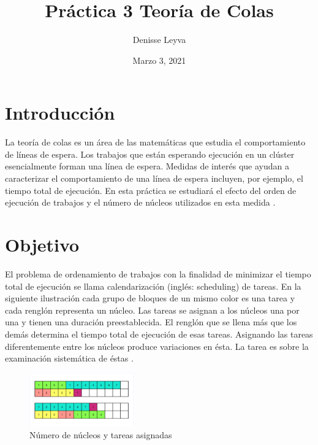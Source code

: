 \documentclass{article}
\title{Práctica 3 Teoría de Colas}
\author{Denisse Leyva}
\date{Marzo 3, 2021}
\begin{document}
\maketitle




\section{Introducción}
La teoría de colas es un área de las matemáticas que estudia el comportamiento de líneas de espera. Los trabajos que están esperando ejecución en un clúster esencialmente forman una línea de espera. Medidas de interés que ayudan a caracterizar el comportamiento de una línea de espera incluyen, por ejemplo, el tiempo total de ejecución. En esta práctica se estudiará el efecto del orden de ejecución de trabajos y el número de núcleos utilizados en esta medida \cite{Satu_Elisa_Schaeffer}.

\section{Objetivo}
El problema de ordenamiento de trabajos con la finalidad de minimizar el tiempo total de ejecución se llama calendarización (inglés: scheduling) de tareas. En la siguiente ilustración cada grupo de bloques de un mismo color es una tarea y cada renglón representa un núcleo. Las tareas se asignan a los núcleos una por una y tienen una duración preestablecida. El renglón que se llena más que los demás determina el tiempo total de ejecución de esas tareas. Asignando las tareas diferentemente entre los núcleos produce variaciones en ésta.
La tarea es sobre la examinación sistemática de éstas \cite{Satu_Elisa_Schaeffer}.


\begin{multicols}{2}
\begin{figure}[H]
\centering
\includegraphics [width =0.4\textwidth]{nucleos.png}
\caption{Número de núcleos y tareas asignadas}
\end{figure}
\end{multicols}
\end{document}
